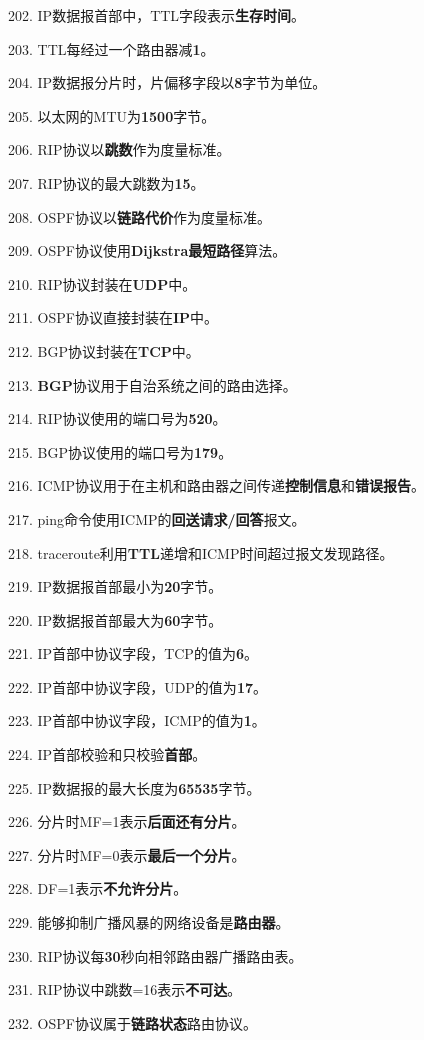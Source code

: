 \documentclass[12pt,a4paper,openany]{ctexbook}
\begin{document}
202. IP数据报首部中，TTL字段表示\textbf{生存时间}。

203. TTL每经过一个路由器减\textbf{1}。

204. IP数据报分片时，片偏移字段以\textbf{8}字节为单位。

205. 以太网的MTU为\textbf{1500}字节。

206. RIP协议以\textbf{跳数}作为度量标准。

207. RIP协议的最大跳数为\textbf{15}。

208. OSPF协议以\textbf{链路代价}作为度量标准。

209. OSPF协议使用\textbf{Dijkstra最短路径}算法。

210. RIP协议封装在\textbf{UDP}中。

211. OSPF协议直接封装在\textbf{IP}中。

212. BGP协议封装在\textbf{TCP}中。

213. \textbf{BGP}协议用于自治系统之间的路由选择。

214. RIP协议使用的端口号为\textbf{520}。

215. BGP协议使用的端口号为\textbf{179}。

216. ICMP协议用于在主机和路由器之间传递\textbf{控制信息}和\textbf{错误报告}。

217. ping命令使用ICMP的\textbf{回送请求/回答}报文。

218. traceroute利用\textbf{TTL}递增和ICMP时间超过报文发现路径。

219. IP数据报首部最小为\textbf{20}字节。

220. IP数据报首部最大为\textbf{60}字节。

221. IP首部中协议字段，TCP的值为\textbf{6}。

222. IP首部中协议字段，UDP的值为\textbf{17}。

223. IP首部中协议字段，ICMP的值为\textbf{1}。

224. IP首部校验和只校验\textbf{首部}。

225. IP数据报的最大长度为\textbf{65535}字节。

226. 分片时MF=1表示\textbf{后面还有分片}。

227. 分片时MF=0表示\textbf{最后一个分片}。

228. DF=1表示\textbf{不允许分片}。

229. 能够抑制广播风暴的网络设备是\textbf{路由器}。

230. RIP协议每\textbf{30}秒向相邻路由器广播路由表。

231. RIP协议中跳数=16表示\textbf{不可达}。

232. OSPF协议属于\textbf{链路状态}路由协议。
\end{document}

